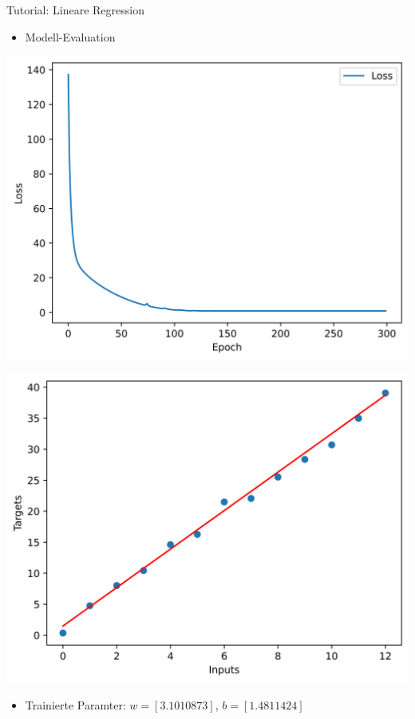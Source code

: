 \documentclass[utf8, smaller, c]{beamer}
\begin{document}
\begin{frame}{Tutorial: Lineare Regression}
	\begin{itemize}
	    \item Modell-Evaluation
	\end{itemize}
	\begin{minipage}{0.49\textwidth}
	    \centering
	    \includegraphics[scale=0.35]{pics/lin_regression_loss_curve.png}
	\end{minipage}
	\begin{minipage}{0.49\textwidth}
	    \centering
	    \includegraphics[scale=0.35]{pics/lin_regression_model_trained.png}
	\end{minipage}
	\begin{itemize}
	    \item Trainierte Paramter: $w=[3.1010873]$, $b=[1.4811424]$
	\end{itemize}
	

\end{frame}
\end{document}
